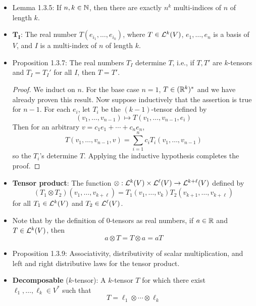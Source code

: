 \documentclass[../notes.tex]{subfiles}
\begin{document}
\begin{itemize}
    \item Lemma 1.3.5: If $n,k\in\N$, then there are exactly $n^k$ multi-indices of $n$ of length $k$.
    \item $\bm{T_I}$: The real number $T(e_{i_1},\dots,e_{i_k})$, where $T\in\lin[k]{V}$, $e_1,\dots,e_n$ is a basis of $V$, and $I$ is a multi-index of $n$ of length $k$.
    \item Proposition 1.3.7: The real numbers $T_I$ determine $T$, i.e., if $T,T'$ are $k$-tensors and $T_I=T_I'$ for all $I$, then $T=T'$.
    \begin{proof}
        We induct on $n$. For the base case $n=1$, $T\in(\R^k)^*$ and we have already proven this result. Now suppose inductively that the assertion is true for $n-1$. For each $e_i$, let $T_i$ be the $(k-1)$-tensor defined by
        \begin{equation*}
            (v_1,\dots,v_{n-1}) \mapsto T(v_1,\dots,v_{n-1},e_i)
        \end{equation*}
        Then for an arbitrary $v=c_1e_1+\cdots+c_ne_n$,
        \begin{equation*}
            T(v_1,\dots,v_{n-1},v) = \sum_{i=1}^nc_iT_i(v_1,\dots,v_{n-1})
        \end{equation*}
        so the $T_i$'s determine $T$. Applying the inductive hypothesis completes the proof.
    \end{proof}
    \item \textbf{Tensor product}: The function $\otimes:\lin[k]{V}\times\lin[\ell]{V}\to\lin[k+\ell]{V}$ defined by
    \begin{equation*}
        (T_1\otimes T_2)(v_1,\dots,v_{k+\ell}) = T_1(v_1,\dots,v_k)T_2(v_{k+1},\dots,v_{k+\ell})
    \end{equation*}
    for all $T_1\in\lin[k]{V}$ and $T_2\in\lin[\ell]{V}$.
    \item Note that by the definition of 0-tensors as real numbers, if $a\in\R$ and $T\in\lin[k]{V}$, then
    \begin{equation*}
        a\otimes T = T\otimes a = aT
    \end{equation*}
    \item Proposition 1.3.9: Associativity, distributivity of scalar multiplication, and left and right distributive laws for the tensor product.
    \item \textbf{Decomposable} ($k$-tensor): A $k$-tensor $T$ for which there exist $\ell_1,\dots,\ell_k\in V^*$ such that
    \begin{equation*}
        T = \ell_1\otimes\cdots\otimes\ell_k

\end{equation*}
\end{itemize}
\end{document}
